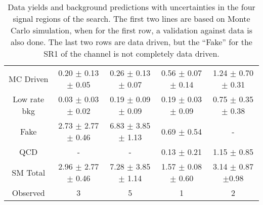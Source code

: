 \begin{table}[!Hhtb]
\begin{center}
\begin{tabular}{c|c|c|c|c}
\hline
\hline
		& \eTau & \muTau & \tauTau \binone & \tauTau \bintwo \\
\hline
MC Driven    & 0.20 $\pm$ 0.13 $\pm$ 0.05 & 0.26 $\pm$ 0.13  $\pm$ 0.07  &  0.56 $\pm$ 0.07 $\pm$ 0.14 & 1.24 $\pm$ 0.70 $\pm$ 0.31  \\
Low rate bkg & 0.03 $\pm$ 0.03 $\pm$ 0.02 & 0.19 $\pm$ 0.09  $\pm$ 0.09  &  0.19 $\pm$ 0.03 $\pm$ 0.09 & 0.75 $\pm$ 0.35 $\pm$ 0.38  \\
Fake         & 2.73 $\pm$ 2.77 $\pm$ 0.46 & 6.83 $\pm$ 3.85  $\pm$ 1.13  &     0.69 $\pm$ 0.54         &           -                 \\

QCD          &             -              &            -                 &     0.13 $\pm$ 0.21         &         1.15 $\pm$ 0.85     \\
\hline
SM Total     & 2.96 $\pm$ 2.77 $\pm$ 0.46 & 7.28 $\pm$ 3.85  $\pm$ 1.14  & 1.57 $\pm$ 0.08 $\pm$ 0.60  & 3.14  $\pm$ 0.87 $\pm$0.98  \\
\hline
\hline
Observed     &               3            &                5             &             1               & 2     \\  
\hline
\hline
\end{tabular}
\caption{Data yields and background predictions with uncertainties in the four signal regions of the search. The first two lines are based on 
Monte Carlo simulation, when for the first row, a validation against data is also done. The last two rows are data driven, but the 
``Fake'' for the SR1 of the \tauTau channel is not completely data driven.
}
\label{tbl:yieldSysSummary}
\end{center}
\end{table}
